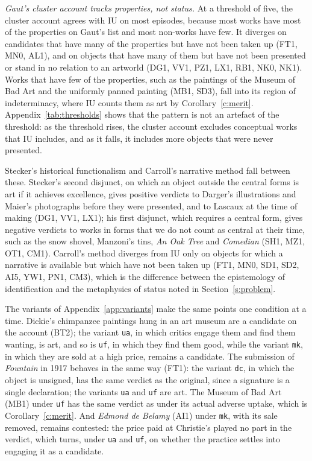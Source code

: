 \documentclass{situationist-preprint}
\begin{document}
\emph{Gaut's cluster account tracks properties, not status.} At a threshold of five, the cluster account agrees with IU on most episodes, because most works have most of the properties on Gaut's list and most non-works have few. It diverges on candidates that have many of the properties but have not been taken up (FT1, MN0, AL1), and on objects that have many of them but have not been presented or stand in no relation to an artworld (DG1, VV1, PZ1, LX1, RB1, NK0, NK1). Works that have few of the properties, such as the paintings of the Museum of Bad Art and the uniformly panned painting (MB1, SD3), fall into its region of indeterminacy, where IU counts them as art by Corollary~\ref{c:merit}. Appendix~\ref{tab:thresholds} shows that the pattern is not an artefact of the threshold: as the threshold rises, the cluster account excludes conceptual works that IU includes, and as it falls, it includes more objects that were never presented.

Stecker's historical functionalism and Carroll's narrative method fall between these. Stecker's second disjunct, on which an object outside the central forms is art if it achieves excellence, gives positive verdicts to Darger's illustrations and Maier's photographs before they were presented, and to Lascaux at the time of making (DG1, VV1, LX1); his first disjunct, which requires a central form, gives negative verdicts to works in forms that we do not count as central at their time, such as the snow shovel, Manzoni's tins, \emph{An Oak Tree} and \emph{Comedian} (SH1, MZ1, OT1, CM1). Carroll's method diverges from IU only on objects for which a narrative is available but which have not been taken up (FT1, MN0, SD1, SD2, AI5, YW1, PN1, CM3), which is the difference between the epistemology of identification and the metaphysics of status noted in Section~\ref{s:problem}.

The variants of Appendix~\ref{app:variants} make the same points one condition at a time. Dickie's chimpanzee paintings hung in an art museum are a candidate on the account (BT2); the variant \texttt{ua}, in which critics engage them and find them wanting, is art, and so is \texttt{uf}, in which they find them good, while the variant \texttt{mk}, in which they are sold at a high price, remains a candidate. The submission of \emph{Fountain} in 1917 behaves in the same way (FT1): the variant \texttt{dc}, in which the object is unsigned, has the same verdict as the original, since a signature is a single declaration; the variants \texttt{ua} and \texttt{uf} are art. The Museum of Bad Art (MB1) under \texttt{uf} has the same verdict as under its actual adverse uptake, which is Corollary~\ref{c:merit}. And \emph{Edmond de Belamy} (AI1) under \texttt{mk}, with its sale removed, remains contested: the price paid at Christie's played no part in the verdict, which turns, under \texttt{ua} and \texttt{uf}, on whether the practice settles into engaging it as a candidate.
\end{document}
